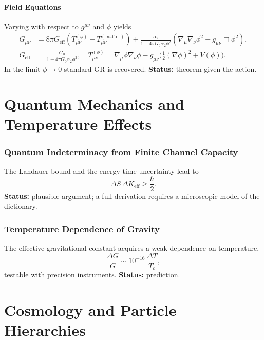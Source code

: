 \documentclass[12pt,a4paper]{article}
\begin{document}
	\subsection{Field Equations}
	Varying with respect to \(g^{\mu\nu}\) and \(\phi\) yields
	\begin{align}
		G_{\mu\nu} &= 8\pi G_{\mathrm{eff}}\left(T_{\mu\nu}^{(\phi)} + T_{\mu\nu}^{(\mathrm{matter})}\right) + \frac{\alpha_2}{1-4\pi G_0\alpha_2\phi^2}\left(\nabla_\mu\nabla_\nu\phi^2 - g_{\mu\nu}\Box\phi^2\right), \label{eq:einstein-mod} \\
		G_{\mathrm{eff}} &= \frac{G_0}{1-4\pi G_0\alpha_2\phi^2},\quad
		T_{\mu\nu}^{(\phi)} = \nabla_\mu\phi\nabla_\nu\phi - g_{\mu\nu}\bigl(\tfrac12(\nabla\phi)^2 + V(\phi)\bigr).
	\end{align}
	In the limit \(\phi\to0\) standard GR is recovered. \textbf{Status:} theorem given the action.
	
	\part{Quantum Mechanics and Temperature Effects}
	
	\section{Quantum Indeterminacy from Finite Channel Capacity}
	The Landauer bound and the energy‑time uncertainty lead to
	\[
	\Delta S \, \Delta K_{\mathrm{eff}} \ge \frac{\hbar}{2}.
	\]
	\textbf{Status:} plausible argument; a full derivation requires a microscopic model of the dictionary.
	
	\section{Temperature Dependence of Gravity}
	\label{sec:temperature}
	The effective gravitational constant acquires a weak dependence on temperature,
	\[
	\frac{\Delta G}{G} \sim 10^{-16}\,\frac{\Delta T}{T_c},
	\]
	testable with precision instruments. \textbf{Status:} prediction.
	
	\part{Cosmology and Particle Hierarchies}
	
\end{document}
